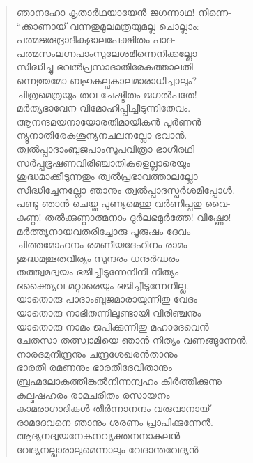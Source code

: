 \begin{verse}
ഞാനഹോ കൃതാര്‍ഥയായേന്‍ ജഗന്നാഥ! നിന്നെ-\\
“ക്കാണായ് വന്നതുമൂലമത്രയുമല്ല ചൊല്ലാം:\\
പത്മജരുദ്രാദികളാലപേക്ഷിതം പാദ-\\
പത്മസംലഗ്നപാംസുലേശമിന്നെനിക്കല്ലോ\\
സിദ്ധിച്ചു ഭവല്‍പ്രസാദാതിരേകത്താലതി-\\
ന്നെത്തുമോ ബഹുകല്പകാലമാരാധിച്ചാലും?\\
ചിത്രമെത്രയും തവ ചേഷ്ടിതം ജഗല്‍പതേ!\\
മര്‍ത്യഭാവേന വിമോഹിപ്പിച്ചീടുന്നിതേവം.\\
ആനന്ദമയനായോരതിമായികന്‍ പൂര്‍ണന്‍\\
ന്യൂനാതിരേകശൂന്യനചലനല്ലോ ഭവാന്‍.\\
ത്വല്‍പ്പാദാംബുജപാംസുപവിത്രാ ഭാഗീരഥി\\
സര്‍പ്പഭൂഷണവിരിഞ്ചാതികളെല്ലാരെയും\\
ശുദ്ധമാക്കീടുന്നതും ത്വല്‍പ്രഭാവത്താലല്ലോ\\
സിദ്ധിച്ചേനല്ലോ ഞാനും ത്വല്‍പ്പാദസ്പര്‍ശമിപ്പോള്‍.\\
പണ്ടു ഞാന്‍ ചെയ്ത പുണ്യമെന്തു വര്‍ണിപ്പതു വൈ-\\
കുണ്ഠ! തല്‍ക്കുണ്ഠാത്മനാം ദുര്‍ലഭമൂര്‍ത്തേ! വിഷ്ണോ!\\
മര്‍ത്ത്യനായവതരിച്ചോരു പൂരുഷം ദേവം\\
ചിത്തമോഹനം രമണീയദേഹിനം രാമം\\
ശുദ്ധമത്ഭുതവീര്യം സുന്ദരം ധനുര്‍ദ്ധരം\\
തത്ത്വമദ്വയം ഭജിച്ചീടുന്നേനിനി നിത്യം\\
ഭക്ത്യൈവ മറ്റാരെയും ഭജിച്ചീടുന്നേനില്ല.\\
യാതൊരു പാദാംബുജമാരായുന്നിതു വേദം\\
യാതൊരു നാഭിതന്നിലുണ്ടായി വിരിഞ്ചനും\\
യാതൊരു നാമം ജപിക്കുന്നിതു മഹാദേവെന്‍\\
ചേതസാ തത്സ്വാമിയെ ഞാന്‍ നിത്യം വണങ്ങുന്നേന്‍.\\
നാരദമുനീന്ദ്രനും ചന്ദ്രശേഖരന്‍താനും\\
ഭാരതീ രമണനും ഭാരതീദേവിതാനും\\
ബ്രഹ്മലോകത്തിങ്കല്‍നിന്നന്വഹം കീര്‍ത്തിക്കുന്നു\\
കല്മഷഹരം രാമചരിതം രസായനം\\
കാമരാഗാദികള്‍ തീര്‍ന്നാനന്ദം വരുവാനായ്\\
രാമദേവനെ ഞാനും ശരണം പ്രാപിക്കുന്നേന്‍.\\
ആദ്യനദ്വയനേകനവ്യക്തനനാകുലന്‍\\
വേദ്യനല്ലാരാലുമെന്നാലും വേദാന്തവേദ്യന്‍\\

\end{verse}
